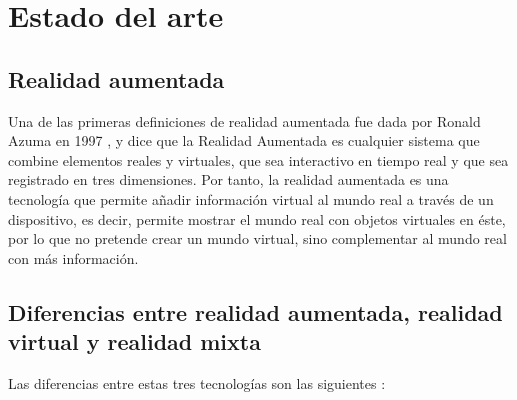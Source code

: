 \chapter{Estado del arte}
\label{ch:estado}

\section{Realidad aumentada}
Una de las primeras definiciones de realidad aumentada fue dada por Ronald Azuma en 1997 \cite{azuma}, y dice que la Realidad Aumentada es cualquier sistema que combine elementos reales y virtuales, que sea interactivo en tiempo real y que sea registrado en tres dimensiones. Por tanto, la realidad aumentada es una tecnología que permite añadir información virtual al mundo real a través de un dispositivo, es decir, permite mostrar el mundo real con objetos virtuales en éste, por lo que no pretende crear un mundo virtual, sino complementar al mundo real con más información.

\section{Diferencias entre realidad aumentada, realidad virtual y realidad mixta}
Las diferencias entre estas tres tecnologías son las siguientes \cite{intel}:

